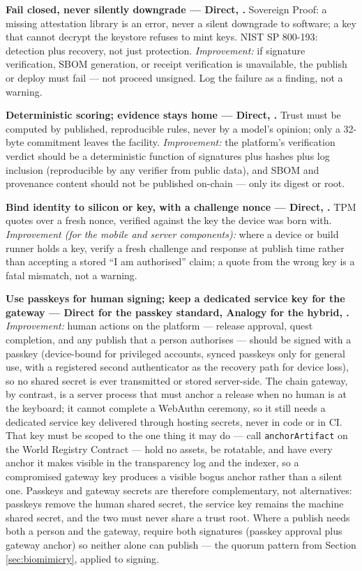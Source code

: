 \documentclass[11pt]{article}
\begin{document}
\textbf{Fail closed, never silently downgrade --- Direct,
\cite{sovereign2026,nist800193}.} Sovereign Proof: a missing
attestation library is an error, never a silent downgrade to software; a
key that cannot decrypt the keystore refuses to mint keys. NIST SP
800-193: detection plus recovery, not just protection.
\emph{Improvement:} if signature verification, SBOM generation, or
receipt verification is unavailable, the publish or deploy must fail ---
not proceed unsigned. Log the failure as a finding, not a warning.

\textbf{Deterministic scoring; evidence stays home --- Direct,
\cite{sovereign2026}.} Trust must be computed by published,
reproducible rules, never by a model's opinion; only a 32-byte
commitment leaves the facility. \emph{Improvement:} the platform's
verification verdict should be a deterministic function of signatures
plus hashes plus log inclusion (reproducible by any verifier from public
data), and SBOM and provenance content should not be published on-chain
--- only its digest or root.

\textbf{Bind identity to silicon or key, with a challenge nonce ---
Direct, \cite{sovereign2026,nist800193}.} TPM quotes over a fresh
nonce, verified against the key the device was born with.
\emph{Improvement (for the mobile and server components):} where a
device or build runner holds a key, verify a fresh challenge and
response at publish time rather than accepting a stored ``I am
authorised'' claim; a quote from the wrong key is a fatal mismatch, not
a warning.

\textbf{Use passkeys for human signing; keep a dedicated service key
for the gateway --- Direct for the passkey standard, Analogy for the
hybrid, \cite{webauthn3,nist80063b4,sovereign2026,nist800193}.}
\emph{Improvement:} human actions on the platform --- release
approval, quest completion, and any publish that a person authorises
--- should be signed with a passkey (device-bound for privileged
accounts, synced passkeys only for general use, with a registered
second authenticator as the recovery path for device loss), so no
shared secret is ever transmitted or stored server-side. The chain
gateway, by contrast, is a server process that must anchor a release
when no human is at the keyboard; it cannot complete a WebAuthn
ceremony, so it still needs a dedicated service key delivered through
hosting secrets, never in code or in CI. That key must be scoped to
the one thing it may do --- call \texttt{anchorArtifact} on the World
Registry Contract --- hold no assets, be rotatable, and have every
anchor it makes visible in the transparency log and the indexer, so a
compromised gateway key produces a visible bogus anchor rather than a
silent one. Passkeys and gateway secrets are therefore complementary,
not alternatives: passkeys remove the human shared secret, the service
key remains the machine shared secret, and the two must never share a
trust root. Where a publish needs both a person and the gateway,
require both signatures (passkey approval plus gateway anchor) so
neither alone can publish --- the quorum pattern from Section
\ref{sec:biomimicry}, applied to signing.
\end{document}
